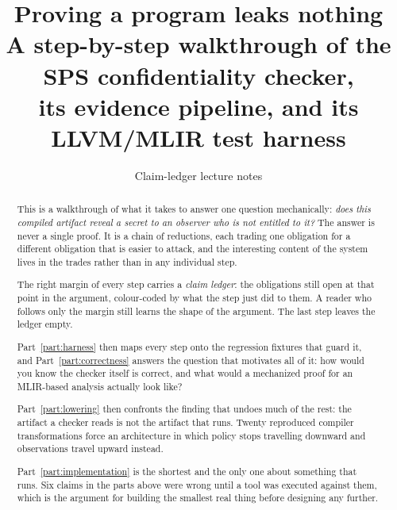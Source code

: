 

\usepackage{spsnotation}

\title{\textbf{Proving a program leaks nothing}\\[2pt]
       \large A step-by-step walkthrough of the SPS confidentiality checker,\\
       \large its evidence pipeline, and its LLVM/MLIR test harness}
\author{Claim-ledger lecture notes}
\date{}


\maketitle

\begin{abstract}
\noindent
This is a walkthrough of what it takes to answer one question mechanically:
\emph{does this compiled artifact reveal a secret to an observer who is not
entitled to it?} The answer is never a single proof. It is a chain of
reductions, each trading one obligation for a different obligation that is
easier to attack, and the interesting content of the system lives in the
trades rather than in any individual step.

The right margin of every step carries a \emph{claim ledger}: the obligations
still open at that point in the argument, colour-coded by what the step just
did to them. A reader who follows only the margin still learns the shape of
the argument. The last step leaves the ledger empty.

Part~\ref{part:harness} then maps every step onto the regression fixtures that
guard it, and Part~\ref{part:correctness} answers the question that motivates
all of it: how would you know the checker itself is correct, and what would a
mechanized proof for an MLIR-based analysis actually look like?

Part~\ref{part:lowering} then confronts the finding that undoes much of the
rest: the artifact a checker reads is not the artifact that runs. Twenty
reproduced compiler transformations force an architecture in which policy stops
travelling downward and observations travel upward instead.

Part~\ref{part:implementation} is the shortest and the only one about something
that runs. Six claims in the parts above were wrong until a tool was executed
against them, which is the argument for building the smallest real thing before
designing any further.
\end{abstract}

\tableofcontents











